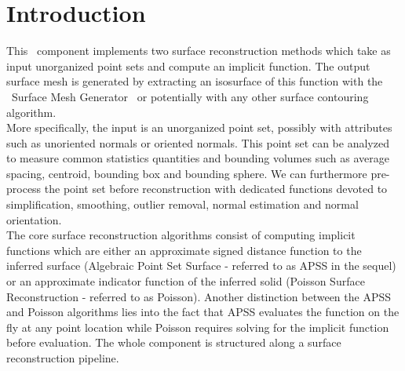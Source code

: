 \section{Introduction}

This \cgal\ component implements two surface reconstruction methods which take as input unorganized point sets and compute an implicit function. The output surface mesh is generated by extracting an isosurface of this function with the \cgal\ Surface Mesh Generator~\cite{cgal:ry-gsddrm-06} or potentially with any other surface contouring algorithm. \\

More specifically, the input is an unorganized point set, possibly with attributes such as unoriented normals or oriented normals. This point set can be analyzed to measure common statistics quantities and bounding volumes such as average spacing, centroid, bounding box and bounding sphere. We can furthermore pre-process the point set before reconstruction with dedicated functions devoted to simplification, smoothing, outlier removal, normal estimation and normal orientation.\\

The core surface reconstruction algorithms consist of computing implicit functions which are either an approximate signed distance function to the inferred surface (Algebraic Point Set Surface - referred to as APSS in the sequel) or an approximate indicator function of the inferred solid (Poisson Surface Reconstruction - referred to as Poisson). Another distinction between the APSS and Poisson algorithms lies into the fact that APSS evaluates the function on the fly at any point location while Poisson requires solving for the implicit function before evaluation. The whole component is structured along a surface reconstruction pipeline.

